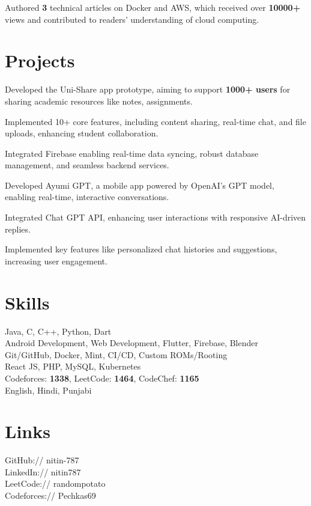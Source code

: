 \documentclass[]{deedy-resume-openfont}
\begin{document}
\hfill {}
\begin{tightemize}
	\item Authored \textbf{3} technical articles on Docker and AWS, which received over \textbf{10000+} views and contributed to readers' understanding of cloud computing.
\end{tightemize}
\sectionsep

\section{Projects}

\begin{tightemize}
	\item Developed the Uni-Share app prototype, aiming to support \textbf{1000+ users} for sharing academic resources like notes, assignments.
	\item Implemented 10+ core features, including content sharing, real-time chat, and file uploads, enhancing student collaboration.
	\item Integrated Firebase enabling real-time data syncing, robust database management, and seamless backend services.
\end{tightemize}
\sectionsep

\begin{tightemize}
	\item Developed Ayumi GPT, a mobile app powered by OpenAI’s GPT model, enabling real-time, interactive conversations.
	\item Integrated Chat GPT API, enhancing user interactions with responsive AI-driven replies.
	\item Implemented key features like personalized chat histories and suggestions, increasing user engagement.
\end{tightemize}
\sectionsep

\section{Skills}
 Java, C, C++, Python, Dart \\
 Android Development, Web Development, Flutter, Firebase, Blender \\
 Git/GitHub, Docker, Mint, CI/CD, Custom ROMs/Rooting \\
 React JS, PHP, MySQL, Kubernetes \\
 Codeforces: \textbf{1338}, LeetCode: \textbf{1464}, CodeChef: \textbf{1165} \\
 English, Hindi, Punjabi
\sectionsep

\section{Links}
GitHub:// nitin-787 \\
LinkedIn:// nitin787 \\
LeetCode:// randompotato \\
Codeforces:// Pechkas69
\sectionsep
\end{document}
